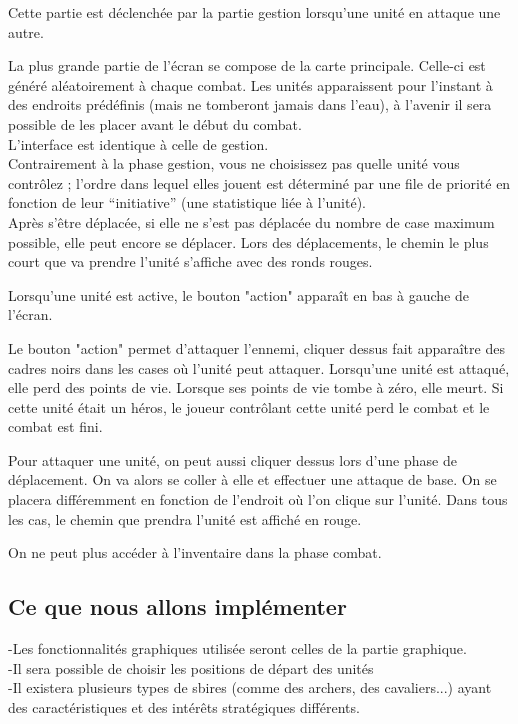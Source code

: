 \documentclass[11pt,a4paper]{article}
\begin{document}
Cette partie est déclenchée par la partie gestion lorsqu'une unité en attaque une autre.

La plus grande partie de l'écran se compose de la carte principale. Celle-ci est généré aléatoirement à chaque combat. Les unités apparaissent pour l'instant à des endroits prédéfinis (mais ne tomberont jamais dans l'eau), à l'avenir il sera possible de les placer avant le début du combat. \\
L'interface est identique à celle de gestion. \\

Contrairement à la phase gestion, vous ne choisissez pas quelle unité vous contrôlez ; l'ordre dans lequel elles jouent est déterminé par une file de priorité en fonction de leur ``initiative'' (une statistique liée à l'unité).\\

Après s'être déplacée, si elle ne s'est pas déplacée du nombre de case maximum possible, elle peut encore se déplacer. Lors des déplacements, le chemin le plus court que va prendre l'unité s'affiche avec des ronds rouges.

Lorsqu'une unité est active, le bouton "action" apparaît en bas à gauche de l'écran.

Le bouton "action" permet d'attaquer l'ennemi, cliquer dessus fait apparaître des cadres noirs dans les cases où l'unité peut attaquer. Lorsqu'une unité est attaqué, elle perd des points de vie. Lorsque ses points de vie tombe à zéro, elle meurt. Si cette unité était un héros, le joueur contrôlant cette unité perd le combat et le combat est fini.

Pour attaquer une unité, on peut aussi cliquer dessus lors d'une phase de déplacement. On va alors se coller à elle et effectuer une attaque de base. On se placera différemment en fonction de l'endroit où l'on clique sur l'unité. Dans tous les cas, le chemin que prendra l'unité est affiché en rouge.

On ne peut plus accéder à l'inventaire dans la phase combat.

\subsection{Ce que nous allons implémenter}

-Les fonctionnalités graphiques utilisée seront celles de la partie graphique. \\
-Il sera possible de choisir les positions de départ des unités \\
-Il existera plusieurs types de sbires (comme des archers, des cavaliers...) ayant des caractéristiques et des intérêts stratégiques différents.
\end{document}
